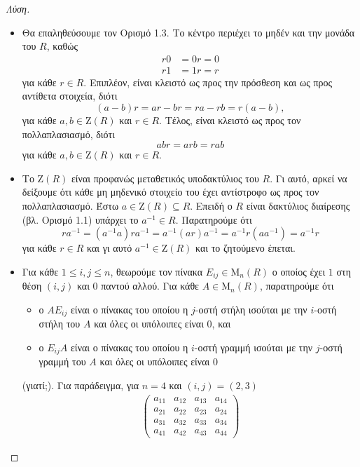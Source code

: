 \documentclass[12pt,a4paper,reqno]{amsart}
\theoremstyle{definition}
\newcommand{\rmM}{\mathrm{M}}
\newcommand{\rmZ}{\mathrm{Z}}
\begin{document}
\begin{proof}[Λύση]
  \leavevmode
  \begin{itemize}
    \item[(1)] Θα επαληθεύσουμε τον Ορισμό 1.3. Το κέντρο περιέχει το μηδέν και την μονάδα του $R$, καθώς 
    \begin{align*}
    r0 &= 0r = 0 \\
    r1 &= 1r = r 
    \end{align*}
    για κάθε $r \in R$. Επιπλέον, είναι κλειστό ως προς την πρόσθεση και ως προς αντίθετα στοιχεία, διότι 
    \[
    (a-b)r = ar - br = ra - rb = r(a-b),
    \]
    για κάθε $a, b \in \rmZ(R)$ και $r \in R$. Τέλος, είναι κλειστό ως προς τον πολλαπλασιασμό, διότι 
    \[
    abr = arb = rab
    \]
    για κάθε $a, b \in \rmZ(R)$ και $r \in R$.
    \item[(2)] Το $\rmZ(R)$ είναι προφανώς μεταθετικός υποδακτύλιος του $R$. Γι αυτό, αρκεί να δείξουμε ότι κάθε μη μηδενικό στοιχείο του έχει αντίστροφο ως προς τον πολλαπλασιασμό. Έστω $a \in \rmZ(R) \subseteq R$. Επειδή ο $R$ είναι δακτύλιος διαίρεσης (βλ. Ορισμό 1.1) υπάρχει το $a^{-1} \in R$. Παρατηρούμε ότι 
    \[
    ra^{-1} = (a^{-1}a)ra^{-1} = a^{-1}(ar)a^{-1} = a^{-1}r(aa^{-1}) = a^{-1}r
    \]
    για κάθε $r \in R$ και γι αυτό $a^{-1} \in \rmZ(R)$ και το ζητούμενο έπεται.
    \item[(γ)] Για κάθε $1 \le i, j \le n$, θεωρούμε τον πίνακα $E_{ij} \in \rmM_n(R)$ ο οποίος έχει $1$ στη θέση $(i,j)$ και $0$ παντού αλλού. Για κάθε $A \in \rmM_n(R)$, παρατηρούμε ότι 
    \begin{itemize}
      \item[$\bullet$] ο $AE_{ij}$ είναι ο πίνακας του οποίου η $j$-οστή στήλη ισούται με την $i$-οστή στήλη του $A$ και όλες οι υπόλοιπες είναι $0$, και 
      \item[$\bullet$] ο $E_{ij}A$ είναι ο πίνακας του οποίου η $i$-οστή γραμμή ισούται με την $j$-οστή γραμμή του $A$ και όλες οι υπόλοιπες είναι $0$
    \end{itemize}
    (γιατί;). Για παράδειγμα, για $n=4$ και $(i,j) = (2,3)$ 
    \begin{align*}
      \begin{pmatrix}
        a_{11} & a_{12} & a_{13} & a_{14} \\
        a_{21} & a_{22} & a_{23} & a_{24} \\
        a_{31} & a_{32} & a_{33} & a_{34} \\
        a_{41} & a_{42} & a_{43} & a_{44} 
      \end{pmatrix}

\end{align*}
\end{itemize}
\end{proof}
\end{document}
